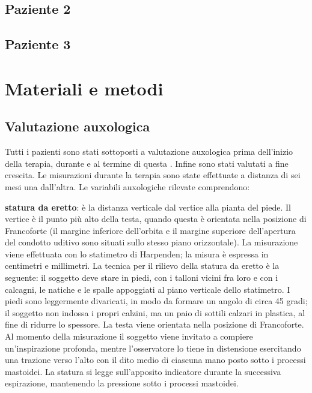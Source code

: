 \subsection*{Paziente 2}

\clearpage

\subsection*{Paziente 3}

\clearpage

\section{Materiali e metodi}

\subsection{Valutazione auxologica}
Tutti i pazienti sono stati sottoposti a valutazione auxologica prima dell'inizio della terapia, durante e al termine di questa . Infine sono stati valutati a fine crescita. Le misurazioni durante la terapia sono state effettuate a distanza di sei mesi una dall'altra.
Le variabili auxologiche rilevate comprendono:


\textbf{statura da eretto}: è la distanza verticale dal vertice alla pianta del piede. Il vertice è il punto più alto della testa, quando questa è orientata nella posizione di Francoforte (il margine inferiore dell'orbita e il margine superiore dell'apertura del condotto uditivo sono situati sullo stesso piano orizzontale). La misurazione viene effettuata con lo statimetro di Harpenden; la misura è espressa in centimetri e millimetri. La tecnica per il rilievo della statura da eretto è la seguente: il soggetto deve stare in piedi, con i talloni vicini fra loro e con i calcagni, le natiche e le spalle appoggiati al piano verticale dello statimetro. I piedi sono leggermente divaricati, in modo da formare un angolo di circa 45 gradi; il soggetto non indossa i propri calzini, ma un paio di sottili calzari in plastica, al fine di ridurre lo spessore. La testa viene orientata nella posizione di Francoforte. Al momento della misurazione il soggetto viene invitato a compiere un'inspirazione profonda, mentre l'osservatore lo tiene in distensione esercitando una trazione verso l'alto con il dito medio di ciascuna mano posto sotto i processi mastoidei. La statura si legge sull'apposito indicatore durante la successiva espirazione, mantenendo la pressione sotto i processi mastoidei.


